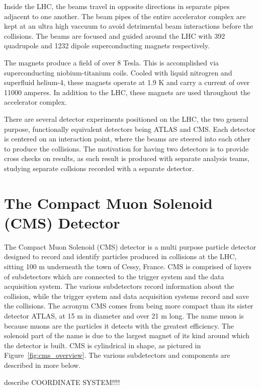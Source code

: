 Inside the LHC, the beams travel in opposite directions in separate pipes adjacent to
one another. The beam pipes of the entire accelerator complex are kept at an ultra high vaccuum
to avoid detrimental beam interactions before the collisions. The beams are focused
and guided around the LHC with 392 quadrupole and 1232 dipole superconducting
magnets respectively.

The magnets produce a field of over 8 Tesla. This is accomplished via superconducting 
niobium-titanium coils. Cooled with liquid nitrogren and superfluid helium-4, these
magnets operate at 1.9 K and carry a current of over 11000 amperes. In addition to
the LHC, these magnets are used throughout the accelerator complex.

There are several detector experiments positioned on the LHC, the two general purpose, functionally equivalent detectors being ATLAS and CMS.
Each detector is centered on an interaction point, where the beams are steered into each other to produce the collisions. 
The motivation for having two detectors is to provide cross checks on results, as each result is produced with separate analysis teams, studying separate collsions
recorded with a separate detector.   

\section{The Compact Muon Solenoid (CMS) Detector}
The Compact Muon Solenoid (CMS) detector is a multi purpose particle detector designed to record and identify particles produced in collisions at the LHC, sitting 100 m underneath
the town of Cessy, France. CMS is comprised of layers of subdetectors which are connected to the trigger system and the data acquisition system.
The various subdetectors record information about the collision, while the trigger system and
data acquisition systems record and save the collisions. The acronym CMS comes from being more compact than its sister detector ATLAS, at 15 m in diameter and
over 21 m long. The name muon is because muons are the particles it detects with the greatest efficiency. The solenoid part of the name is due to the largest magnet of its kind
around which the detector is built. CMS is cylindrical in shape, as pictured in Figure~\ref{fig:cms_overview}. The various subdetectors and components are described in more
below. 


describe COORDINATE SYSTEM!!!!

